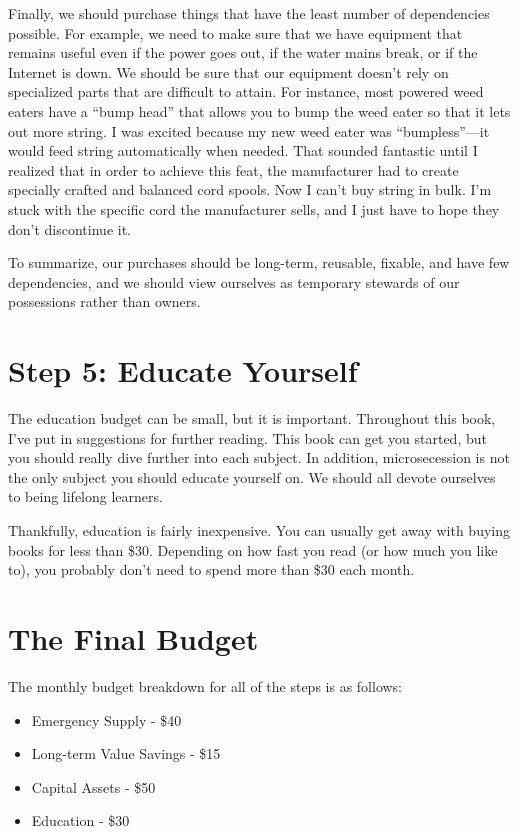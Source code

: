 \begin{infonote}
Finally, we should purchase things that have the least number of
dependencies possible.  For example, we need
to make sure that we have equipment that remains useful even if the
power goes out, if the water mains break, or if the Internet is down.
We should be sure that our equipment doesn't rely on
specialized parts that are difficult to attain. For instance, most
powered weed eaters have a ``bump head'' that allows you to bump the weed
eater so that it lets out more string. I was excited because my new
weed eater was ``bumpless''---it would feed string automatically when
needed. That sounded fantastic until I realized that in order to
achieve this feat, the manufacturer had to create specially crafted and
balanced cord spools. Now I can't buy string in bulk.
I'm stuck with the specific cord the manufacturer
sells, and I just have to hope they don't discontinue it.

To summarize, our purchases should be long-term, reusable, fixable, and
have few dependencies, and we should view ourselves as temporary
stewards of our possessions rather than owners.
\end{infonote}

\section{Step 5: Educate Yourself}

The education budget can be small, but it is important. Throughout this
book, I've put in suggestions for further reading.
This book can get you started, but you should really dive further into
each subject. In addition, microsecession is not the only subject you
should educate yourself on. We should all devote ourselves to being
lifelong learners.

Thankfully, education is fairly inexpensive. You can usually get away
with buying books for less than \$30. Depending on how fast you read
(or how much you like to), you probably don't need to
spend more than \$30 each month. 

\section{The Final Budget}

The monthly budget breakdown for all of the steps is as follows:

\begin{itemize}
\item 
Emergency Supply - \$40
\item 
Long-term Value Savings - \$15
\item 
Capital Assets - \$50
\item 
Education - \$30
\end{itemize}

